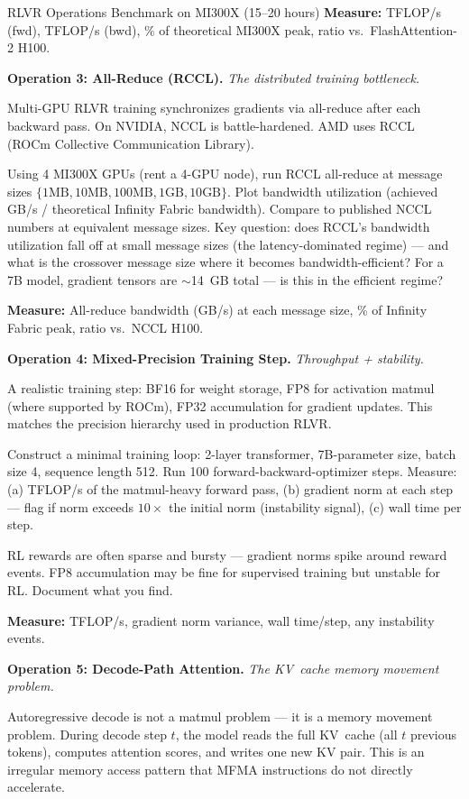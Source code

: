 \begin{exercise}{RLVR Operations Benchmark on MI300X (15--20 hours)}
\textbf{Measure:} TFLOP/s (fwd), TFLOP/s (bwd), \% of theoretical MI300X peak, ratio vs.\ FlashAttention-2 H100.

\medskip
\textbf{Operation 3: All-Reduce (RCCL).} \textit{The distributed training bottleneck.}

Multi-GPU RLVR training synchronizes gradients via all-reduce after each backward pass. On NVIDIA, NCCL is battle-hardened. AMD uses RCCL (ROCm Collective Communication Library).

Using 4 MI300X GPUs (rent a 4-GPU node), run RCCL all-reduce at message sizes $\{1\text{MB}, 10\text{MB}, 100\text{MB}, 1\text{GB}, 10\text{GB}\}$. Plot bandwidth utilization (achieved GB/s / theoretical Infinity Fabric bandwidth). Compare to published NCCL numbers at equivalent message sizes. Key question: does RCCL's bandwidth utilization fall off at small message sizes (the latency-dominated regime) --- and what is the crossover message size where it becomes bandwidth-efficient? For a 7B model, gradient tensors are $\sim$14~GB total --- is this in the efficient regime?

\textbf{Measure:} All-reduce bandwidth (GB/s) at each message size, \% of Infinity Fabric peak, ratio vs.\ NCCL H100.

\medskip
\textbf{Operation 4: Mixed-Precision Training Step.} \textit{Throughput + stability.}

A realistic training step: BF16 for weight storage, FP8 for activation matmul (where supported by ROCm), FP32 accumulation for gradient updates. This matches the precision hierarchy used in production RLVR.

Construct a minimal training loop: 2-layer transformer, 7B-parameter size, batch size 4, sequence length 512. Run 100 forward-backward-optimizer steps. Measure: (a) TFLOP/s of the matmul-heavy forward pass, (b) gradient norm at each step --- flag if norm exceeds $10\times$ the initial norm (instability signal), (c) wall time per step.

RL rewards are often sparse and bursty --- gradient norms spike around reward events. FP8 accumulation may be fine for supervised training but unstable for RL. Document what you find.

\textbf{Measure:} TFLOP/s, gradient norm variance, wall time/step, any instability events.

\medskip
\textbf{Operation 5: Decode-Path Attention.} \textit{The KV~cache memory movement problem.}

Autoregressive decode is not a matmul problem --- it is a memory movement problem. During decode step $t$, the model reads the full KV~cache (all $t$ previous tokens), computes attention scores, and writes one new KV pair. This is an irregular memory access pattern that MFMA instructions do not directly accelerate.


\end{exercise}

